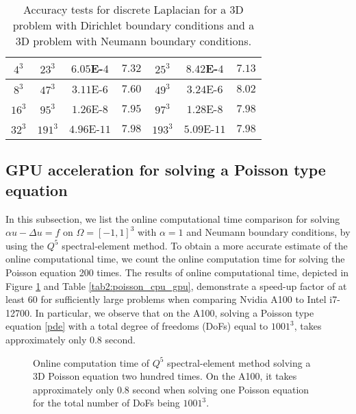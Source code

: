 \documentclass{article}
\begin{document}
\begin{table}[!ht]
\begin{tabular}{|c|c c c|c c c|}
    \hline
    $4^3$ & $23^3$ &  $6.05$E-$4$ & $7.32$ & $25^3$ & $8.42$E-$4$ & $7.13$\\
    \hline
     $8^3$ & $47^3$ & $3.11$E-$6$ & $7.60$ & $49^3$ & $3.24$E-$6$ & $8.02$\\
    \hline
    $16^3$ & $95^3$ & $1.26$E-$8$ & $7.95$ & $97^3$ & $1.28$E-$8$ & $7.98$\\
    \hline
    $32^3$ & $191^3$ & $4.96$E-$11$ & $7.98$ & $193^3$ & $5.09$E-$11$ & $7.98$\\
    \hline
    \end{tabular}
    \caption{Accuracy tests for discrete Laplacian for a 3D problem with Dirichlet boundary conditions and a 3D problem with Neumann boundary conditions.}
    \label{tab1:accuracy test dirichlet/neumann}
\end{table}

\subsection{GPU acceleration for solving a Poisson type equation}
\label{sec:poisson-speedup}

In this subsection, we list the online computational time comparison
for solving $\alpha u -\Delta u = f$ on $\Omega=[-1,1]^3$ with $\alpha=1$ and Neumann boundary conditions, by using the $Q^5$ spectral-element method. 
 To obtain a more accurate estimate of the online computational time, we count the online computation time for solving the Poisson equation   200 times.   The results of online computational time, depicted in Figure \ref{fig1:poisson_cpu_gpu} and Table \ref{tab2:poisson_cpu_gpu}, demonstrate a speed-up factor of at least 60 for sufficiently large problems  when comparing Nvidia A100 to Intel i7-12700. In particular, we observe that on the A100, solving a Poisson type equation \eqref{pde} with a total degree of freedoms (DoFs) equal to $1001^3$, takes approximately only 0.8 second.

\begin{figure}[!ht]
\caption{Online computation time of $Q^5$ spectral-element method solving a 3D Poisson equation two hundred times.
On the A100, it takes approximately only 0.8 second when solving one Poisson equation for the total number of DoFs being $1001^3$.}
	\label{fig1:poisson_cpu_gpu}
 \end{figure}
\end{document}
